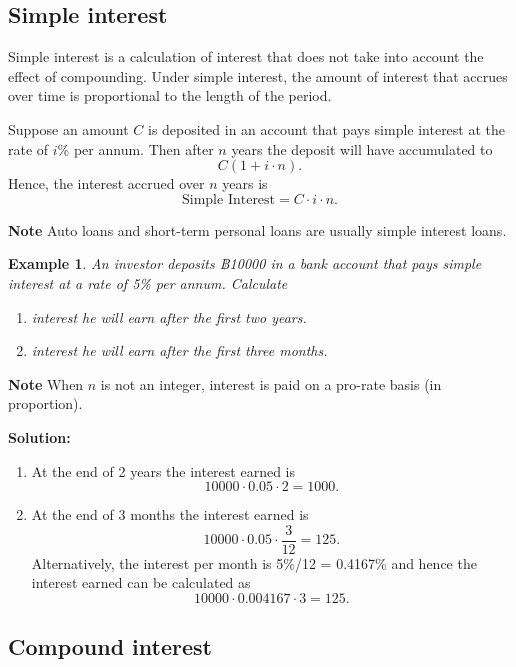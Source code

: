 \documentclass[
]{book}
\theoremstyle{definition}
\theoremstyle{definition}
\newtheorem{example}{Example}[chapter]
\theoremstyle{definition}
\theoremstyle{definition}
\theoremstyle{remark}
\begin{document}
\subsection{Simple interest}\label{simple-interest}

Simple interest is a calculation of interest that does not take into
account the effect of compounding. Under simple interest, the amount of interest that accrues over time is proportional to the length of the period.

Suppose an amount \(C\) is deposited in
an account that pays simple interest at the rate of \(i\)\% per annum. Then
after \(n\) years the deposit will have accumulated to
\[C( 1 + i \cdot n).\] Hence, the interest accrued over \(n\) years is
\[\text{Simple Interest}  = C \cdot i \cdot n.\]

\textbf{Note} Auto loans and short-term personal loans are usually simple
interest loans.

\begin{example}

\emph{An investor deposits ฿10000 in a bank account that pays simple interest
at a rate of 5\% per annum. Calculate}

\begin{enumerate}
\def\labelenumi{\arabic{enumi}.}
\item
  \emph{interest he will earn after the first two years.}
\item
  \emph{interest he will earn after the first three months.}
\end{enumerate}

\end{example}

\textbf{Note} When \(n\) is not an integer, interest is paid on a pro-rate
basis (in proportion).

\textbf{Solution:}

\begin{enumerate}
\def\labelenumi{\arabic{enumi}.}
\item
  At the end of 2 years the interest earned is
  \[10000 \cdot 0.05 \cdot 2 = 1000.\]
\item
  At the end of 3 months the interest earned is
  \[10000 \cdot 0.05 \cdot \frac{3}{12} = 125.\] Alternatively, the
  interest per month is 5\%/12 = 0.4167\% and hence the interest earned
  can be calculated as \[10000 \cdot 0.004167 \cdot 3 = 125.\]
\end{enumerate}

\subsection{Compound interest}\label{compound-interest}
\end{document}
